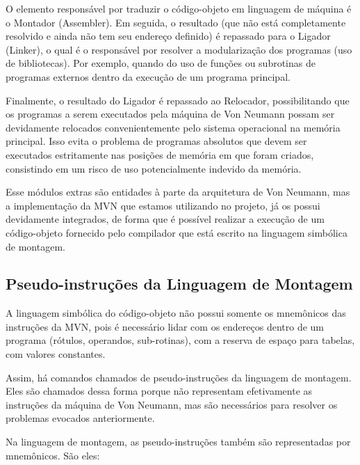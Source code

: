 O elemento responsável por traduzir o código-objeto em linguagem de máquina é o Montador (Assembler). Em seguida, o resultado (que não está completamente resolvido e ainda não tem seu endereço definido) é repassado para o Ligador (Linker), o qual é o responsável por resolver a modularização dos programas (uso de bibliotecas). Por exemplo, quando do uso de funções ou subrotinas de programas externos dentro da execução de um programa principal.


Finalmente, o resultado do Ligador é repassado ao Relocador, possibilitando que os programas a serem executados pela máquina de Von Neumann possam ser devidamente relocados convenientemente pelo sistema operacional na memória principal. Isso evita o problema de programas absolutos que devem ser executados estritamente nas posições de memória em que foram criados, consistindo em um risco de uso potencialmente indevido da memória.


Esse módulos extras são entidades à parte da arquitetura de Von Neumann, mas a implementação da MVN que estamos utilizando no projeto, já os possui devidamente integrados, de forma que é possível realizar a execução de um código-objeto fornecido pelo compilador que está escrito na linguagem simbólica de montagem.


\subsection{Pseudo-instruções da Linguagem de Montagem}
  \label{chap:pseudo_instrucoes}


A linguagem simbólica do código-objeto não possui somente os mnemônicos das instruções da MVN, pois é necessário lidar com os endereços dentro de um programa (rótulos, operandos, sub-rotinas), com a reserva de espaço para tabelas, com valores constantes. 


Assim, há comandos chamados de pseudo-instruções da linguagem de montagem. Eles são chamados dessa forma porque não representam efetivamente as instruções da máquina de Von Neumann, mas são necessários para resolver os problemas evocados anteriormente.


Na linguagem de montagem, as pseudo-instruções também são representadas por mnemônicos. São eles:


